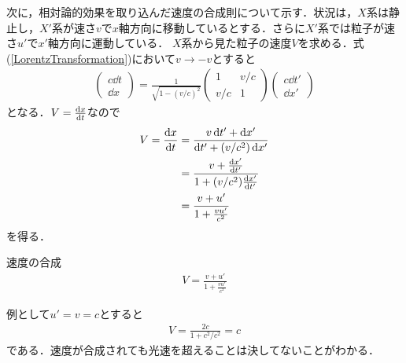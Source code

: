 \documentclass{report}
\begin{document}
  次に，相対論的効果を取り込んだ速度の合成則について示す．状況は，$X$系は静止し，$X'$系が速さ$v$で$x$軸方向に移動しているとする．さらに$X'$系では粒子が速さ$u'$で$x'$軸方向に運動している．
  $X$系から見た粒子の速度$V$を求める．式(\ref{LorentzTransformation})において$v\to -v$とすると
  \begin{align}
    \begin{pmatrix}
      c\dd{t} \\ \dd{x}
    \end{pmatrix}
    =
    \frac{1}{\sqrt{1 - (v/c)^2}}
    \begin{pmatrix}
      1 & v/c\\
      v/c & 1
    \end{pmatrix}
    \begin{pmatrix}
      c\dd{t'}\\\dd{x'}
    \end{pmatrix}
  \end{align}
  となる．$V=\dv{x}{t}$なので
  \begin{align}
    V = \dv{x}{t} &= \frac{v \dd{t'} + \dd{x'}}{\dd{t'} + (v/c^2)\dd{x'}}\\
    &= \frac{v + \dv{x'}{t'}}{1 + (v/c^2)\dv{x'}{t'}}\\
    &= \frac{v + u'}{1 + \frac{vu'}{c^2}}
  \end{align}
  を得る．
  \begin{itembox}[l]{速度の合成}
    \begin{align}
      V = \frac{v + u'}{1 + \frac{vu'}{c^2}}
    \end{align}
  \end{itembox}
  例として$u' = v = c$とすると
  \begin{align}
    V = \frac{2c}{1+c^2/c^2} = c
  \end{align}
  である．速度が合成されても光速を超えることは決してないことがわかる．
\end{document}
